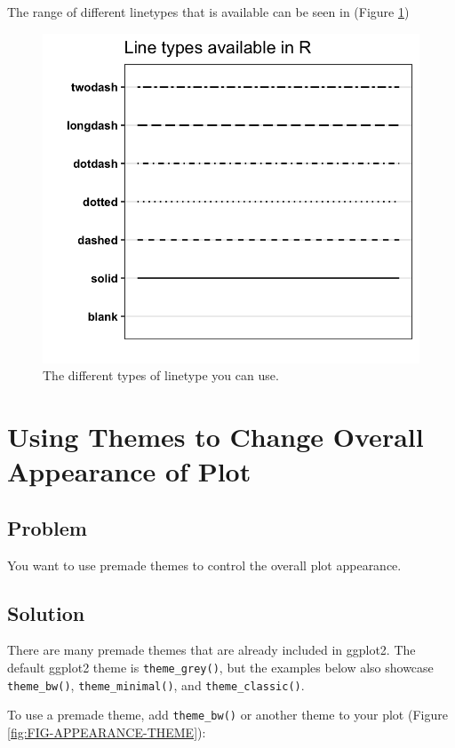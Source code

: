 \documentclass[
]{book}
\begin{document}
The range of different linetypes that is available can be seen in (Figure \ref{fig:FIG-LINETYPE-AES})

\begin{figure}

{\centering \includegraphics[width=0.5\linewidth]{images/chapter-7/linetype} 

}

\caption[The different types of linetype you can use]{The different types of linetype you can use.}\label{fig:FIG-LINETYPE-AES}
\end{figure}

\hypertarget{LINE-GRAPH-APPEARANCE-THEME}{%
\section{Using Themes to Change Overall Appearance of Plot}\label{LINE-GRAPH-APPEARANCE-THEME}}

\hypertarget{problem-25}{%
\subsection{Problem}\label{problem-25}}

You want to use premade themes to control the overall plot appearance.

\hypertarget{solution-25}{%
\subsection{Solution}\label{solution-25}}

There are many premade themes that are already included in ggplot2. The default ggplot2 theme is \texttt{theme\_grey()}, but the examples below also showcase \texttt{theme\_bw()}, \texttt{theme\_minimal()}, and \texttt{theme\_classic()}.

To use a premade theme, add \texttt{theme\_bw()} or another theme to your plot (Figure \ref{fig:FIG-APPEARANCE-THEME}):
\end{document}
